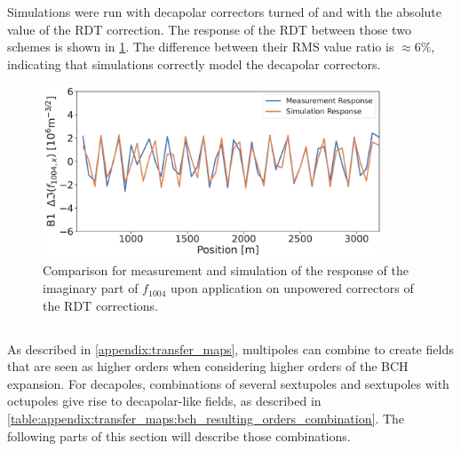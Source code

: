 Simulations were run with decapolar correctors turned of and with the absolute value of the RDT
correction. The response of the RDT between those two schemes is shown in 
\cref{fig:decapoles:rdt:b1_response_corr}. The difference between their RMS value ratio is $\approx
6\%$, indicating that simulations correctly model the decapolar correctors.

\begin{figure}[!htb]
    \centering
    \includegraphics[width=0.9\textwidth]{./images/f1004/b1_response_rdt_corr.pdf}
    \caption{Comparison for measurement and simulation of the response of the imaginary part of
    $f_{1004}$ upon application on unpowered correctors of the RDT corrections.}
    \label{fig:decapoles:rdt:b1_response_corr}
\end{figure}



\subsection{}
\label{section:decapoles:feed_up}


\subsubsection{}

As described in \cref{appendix:transfer_maps}, multipoles can combine to create fields that are seen
as higher orders when considering higher orders of the BCH expansion.
For decapoles, combinations of several sextupoles and sextupoles with octupoles give rise to
decapolar-like fields, as described in
\cref{table:appendix:transfer_maps:bch_resulting_orders_combination}. The following parts of this
section will describe those combinations.

